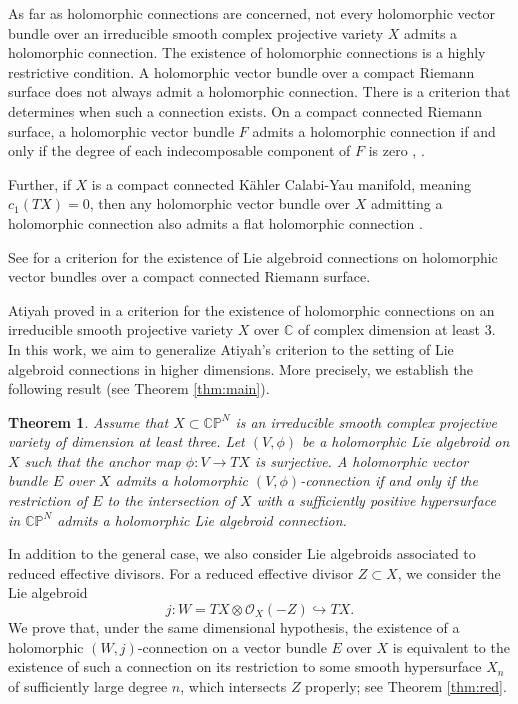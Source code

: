\documentclass[12pt,reqno]{amsart}
\numberwithin{equation}{section}
\newtheorem{theorem}{Theorem}[section]
\theoremstyle{definition}
\begin{document}
As far as holomorphic connections are concerned, not every holomorphic vector bundle over an
irreducible smooth complex projective variety $X$ admits a holomorphic connection. The existence of 
holomorphic connections is a highly restrictive condition. A holomorphic vector bundle over a 
compact Riemann surface does not always admit a holomorphic connection. There is a criterion 
that determines when such a connection exists. On a compact connected Riemann surface, a
holomorphic vector bundle $F$ admits a holomorphic connection if and only if the degree of each
indecomposable component of $F$ is zero \cite{At}, \cite{We}.

Further, if $X$ is a compact connected K\"ahler Calabi-Yau manifold, meaning $c_1(TX)  =  0$,
then any holomorphic vector bundle over $X$ admitting a
holomorphic connection also admits a flat holomorphic connection \cite{BD}.

See \cite{ABKS} for a criterion for the existence of Lie algebroid connections on holomorphic vector bundles 
over a compact connected Riemann surface.

Atiyah proved in \cite[Proposition~21]{At} a criterion for the existence of holomorphic connections on an
irreducible smooth projective variety $ X$ over $\mathbb{C}$ of complex dimension at least $3$. In this
work, we aim to generalize Atiyah’s criterion to the setting of Lie algebroid connections in higher
dimensions. More precisely, we establish the following result (see Theorem \ref{thm:main}).

\begin{theorem}
\label{thm:main0}
Assume that $X   \subset  {\mathbb C}{\mathbb P}^N$ is an irreducible
smooth complex projective variety of dimension at least three. Let $(V,  \phi)$ be
a holomorphic Lie algebroid on $X$ such that the anchor map $\phi   :   V 
\longrightarrow  TX$ is surjective. A holomorphic vector bundle $E$ over $X$ admits a holomorphic
$(V,  \phi)$-connection if and only if the restriction of $E$ to the intersection of $X$ with a sufficiently
positive hypersurface in ${\mathbb C}{\mathbb P}^N$ admits a holomorphic Lie algebroid connection.
\end{theorem}

In addition to the general case, we also consider Lie algebroids associated to reduced
effective divisors. For a reduced effective divisor $Z \subset X$, we consider the Lie algebroid
$$j : W = TX \otimes \mathcal{O}_X(-Z)  \hookrightarrow  TX.$$ We prove that, under the
same dimensional hypothesis, the existence of a holomorphic $(W, j)$-connection on a vector bundle $E$ over
$X$ is equivalent to the
existence of such a connection on its restriction to some smooth
hypersurface $X_n$ of sufficiently large degree $n$, which intersects $Z$ properly; see Theorem \ref{thm:red}.
\end{document}
